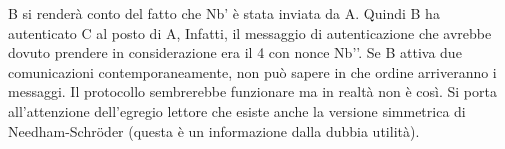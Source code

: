 B si renderà conto del fatto che Nb’ è stata inviata da A. Quindi B ha
autenticato C al posto di A,
Infatti, il messaggio di autenticazione che avrebbe dovuto prendere in
considerazione era il 4 con
nonce Nb’’.
Se B attiva due comunicazioni contemporaneamente, non può sapere in che
ordine arriveranno i
messaggi.
Il protocollo sembrerebbe funzionare ma in realtà non è così.
Si porta all'attenzione dell'egregio lettore che esiste anche la versione
simmetrica di Needham-Schröder (questa è un informazione dalla
dubbia utilità).


